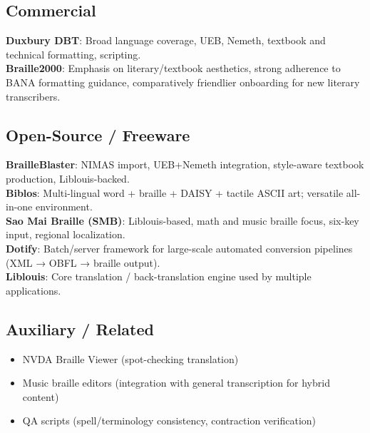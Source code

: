 \subsection*{Commercial}
\textbf{Duxbury DBT}\supercite{Duxbury}: Broad language coverage, UEB, Nemeth, textbook and technical formatting, scripting. \\
\textbf{Braille2000}\supercite{Braille2000}: Emphasis on literary/textbook aesthetics, strong adherence to BANA formatting guidance, comparatively friendlier onboarding for new literary transcribers.

\subsection*{Open-Source / Freeware}
\textbf{BrailleBlaster}\supercite{BrailleBlaster}: NIMAS import, UEB+Nemeth integration, style-aware textbook production, Liblouis-backed. \\
\textbf{Biblos}\supercite{Biblos}: Multi-lingual word  + braille + DAISY + tactile ASCII art; versatile all-in-one environment. \\
\textbf{Sao Mai Braille (SMB)}\supercite{SMB}: Liblouis-based, math and music braille focus, six-key input, regional localization. \\
\textbf{Dotify}\supercite{Dotify}: Batch/server framework for large-scale automated conversion pipelines (XML → OBFL → braille output). \\
\textbf{Liblouis}\supercite{Liblouis}: Core translation / back-translation engine used by multiple applications.

\subsection*{Auxiliary / Related}
\begin{itemize}
	\item NVDA Braille Viewer (spot-checking translation)
	\item Music braille editors (integration with general transcription for hybrid content)
	\item QA scripts (spell/terminology consistency, contraction verification)
\end{itemize}

